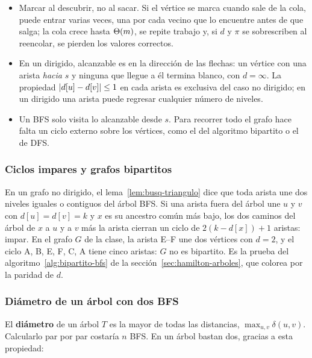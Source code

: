 \documentclass[11pt,letterpaper]{article}
\begin{document}
\begin{ojo}
  \begin{itemize}[leftmargin=1.2em, itemsep=0.15em]
    \item Marcar al descubrir, no al sacar. Si el vértice se marca
      cuando sale de la cola, puede entrar varias veces, una por cada
      vecino que lo encuentre antes de que salga; la cola crece hasta
      $\Theta\!\left(m\right)$, se repite trabajo y, si $d$ y $\pi$ se sobrescriben
      al reencolar, se pierden los valores correctos.
    \item En un dirigido, alcanzable es en la dirección de las
      flechas: un vértice con una arista \textit{hacia} $s$ y ninguna
      que llegue a él termina blanco, con $d = \infty$. La propiedad
      $\left\lvert d[u] - d[v] \right\rvert \leq 1$ en cada arista es exclusiva del caso
      no dirigido; en un dirigido una arista puede regresar cualquier
      número de niveles.
    \item Un BFS solo visita lo alcanzable desde $s$. Para recorrer
      todo el grafo hace falta un ciclo externo sobre los vértices,
      como el del algoritmo bipartito o el de DFS.
  \end{itemize}
\end{ojo}

\subsubsection*{Ciclos impares y grafos bipartitos}

En un grafo no dirigido, el lema~\ref{lem:busq-triangulo} dice que
toda arista une dos niveles iguales o contiguos del árbol BFS. Si una
arista fuera del árbol une $u$ y $v$ con $d[u] = d[v] = k$ y $x$ es su
ancestro común más bajo, los dos caminos del árbol de $x$ a $u$ y a
$v$ más la arista cierran un ciclo de $2(k - d[x]) + 1$ aristas:
impar. En el grafo $G$ de la clase, la arista E--F une dos vértices
con $d = 2$, y el ciclo A, B, E, F, C, A tiene cinco aristas: $G$ no
es bipartito. Es la prueba del algoritmo~\ref{alg:bipartito-bfs} de
la sección~\ref{sec:hamilton-arboles}, que colorea por la paridad de
$d$.

\subsubsection*{Diámetro de un árbol con dos BFS}

El \textbf{diámetro} de un árbol $T$ es la mayor de todas las
distancias, $\max_{u, v} \delta(u, v)$. Calcularlo par por par
costaría $n$ BFS. En un árbol bastan dos, gracias a esta propiedad:
\end{document}
